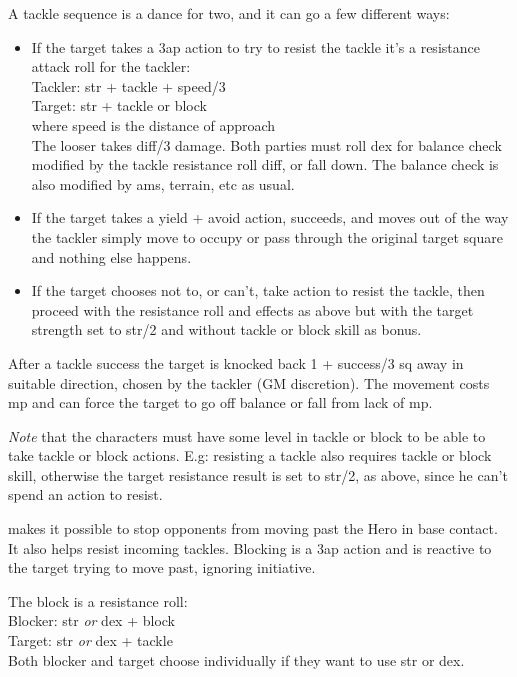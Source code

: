 A tackle sequence is a dance for two, and it can go a few different ways:
\begin{itemize}
    \item If the target takes a 3ap action to try to resist the tackle it's a resistance attack roll for the tackler:\\
    Tackler: str + tackle + speed/3 \\
    Target: str + tackle or block \\
    where speed is the distance of approach \\
    The looser takes diff/3 damage. Both parties must roll dex for balance check modified by the tackle resistance roll diff, or fall down. The balance check is also modified by ams, terrain, etc as usual.
    \item If the target takes a yield + avoid action, succeeds, and moves out of the way the tackler simply move to occupy or pass through the original target square and nothing else happens.
    \item If the target chooses not to, or can't, take action to resist the tackle, then proceed with the resistance roll and effects as above but with the target strength set to str/2 and without tackle or block skill as bonus.
\end{itemize}
After a tackle success the target is knocked back 1 + success/3 sq away in suitable direction, chosen by the tackler (GM discretion). The movement costs mp and can force the target to go off balance or fall from lack of mp.

\emph{Note} that the characters must have some level in tackle or block to be able to take tackle or block actions. E.g: resisting a tackle also requires tackle or block skill, otherwise the target resistance result is set to str/2, as above, since he can't spend an action to resist.


 makes it possible to stop opponents from moving past the Hero in base contact. It also helps resist incoming tackles. Blocking is a 3ap action and is reactive to the target trying to move past, ignoring initiative.

The block is a resistance roll: \\
Blocker: str \emph{or} dex + block \\
Target: str \emph{or} dex + tackle \\
Both blocker and target choose individually if they want to use str or dex.

